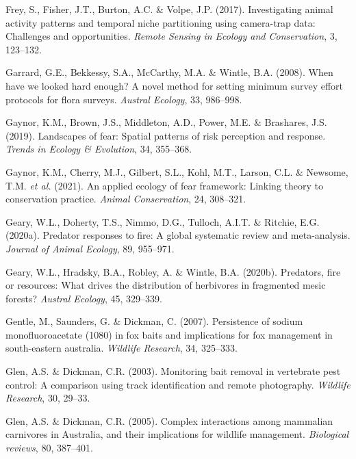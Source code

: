 \documentclass[11pt,a4paper,titlepage,twoside,openright]{style/unimelbthesis}
\begin{document}
\begin{mainmatter}
\leavevmode\hypertarget{ref-frey2017investigating}{}%
Frey, S., Fisher, J.T., Burton, A.C. \& Volpe, J.P. (2017). Investigating animal activity patterns and temporal niche partitioning using camera-trap data: Challenges and opportunities. \emph{Remote Sensing in Ecology and Conservation}, 3, 123--132.

\leavevmode\hypertarget{ref-garrard2008when}{}%
Garrard, G.E., Bekkessy, S.A., McCarthy, M.A. \& Wintle, B.A. (2008). When have we looked hard enough? A novel method for setting minimum survey effort protocols for flora surveys. \emph{Austral Ecology}, 33, 986--998.

\leavevmode\hypertarget{ref-gaynor2019landscapes}{}%
Gaynor, K.M., Brown, J.S., Middleton, A.D., Power, M.E. \& Brashares, J.S. (2019). Landscapes of fear: Spatial patterns of risk perception and response. \emph{Trends in Ecology \& Evolution}, 34, 355--368.

\leavevmode\hypertarget{ref-gaynor2021applied}{}%
Gaynor, K.M., Cherry, M.J., Gilbert, S.L., Kohl, M.T., Larson, C.L. \& Newsome, T.M. \emph{et al.} (2021). An applied ecology of fear framework: Linking theory to conservation practice. \emph{Animal Conservation}, 24, 308--321.

\leavevmode\hypertarget{ref-geary2020predator}{}%
Geary, W.L., Doherty, T.S., Nimmo, D.G., Tulloch, A.I.T. \& Ritchie, E.G. (2020a). Predator responses to fire: A global systematic review and meta-analysis. \emph{Journal of Animal Ecology}, 89, 955--971.

\leavevmode\hypertarget{ref-geary2020predators}{}%
Geary, W.L., Hradsky, B.A., Robley, A. \& Wintle, B.A. (2020b). Predators, fire or resources: What drives the distribution of herbivores in fragmented mesic forests? \emph{Austral Ecology}, 45, 329--339.

\leavevmode\hypertarget{ref-gentle2007persistence}{}%
Gentle, M., Saunders, G. \& Dickman, C. (2007). Persistence of sodium monofluoroacetate (1080) in fox baits and implications for fox management in south-eastern australia. \emph{Wildlife Research}, 34, 325--333.

\leavevmode\hypertarget{ref-glen2003monitoring}{}%
Glen, A.S. \& Dickman, C.R. (2003). Monitoring bait removal in vertebrate pest control: A comparison using track identification and remote photography. \emph{Wildlife Research}, 30, 29--33.

\leavevmode\hypertarget{ref-glen2005complex}{}%
Glen, A.S. \& Dickman, C.R. (2005). Complex interactions among mammalian carnivores in Australia, and their implications for wildlife management. \emph{Biological reviews}, 80, 387--401.


\end{mainmatter}
\end{document}
